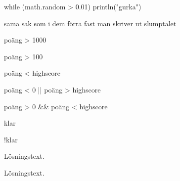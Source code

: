 \Subtask while (math.random > 0.01) println("gurka")

\Subtask  sama sak som i dem förra fast man skriver ut slumptalet

\Task %

\Subtask  poäng > 1000

\Subtask poäng > 100

\Subtask  poäng < highscore

\Subtask poäng < 0 || poäng > highscore 

\Subtask  poäng > 0 \&\& poäng < highscore

\Subtask  klar

\Subtask  !klar




\ExtraTasks %

\Task 

\Subtask 

\Subtask Lösningstext.


\AdvancedTasks %

\Task 

\Subtask {}

\Subtask Lösningstext.
